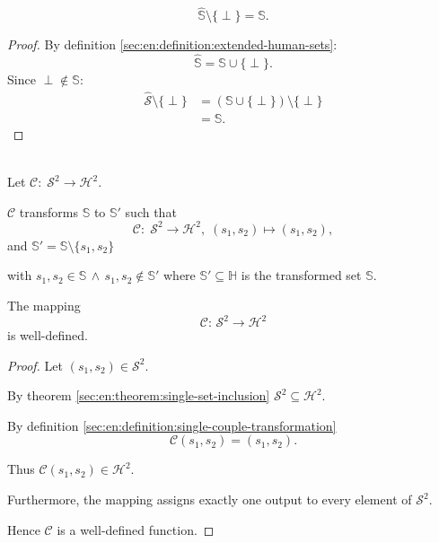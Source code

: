 \begin{proposition}
    \begin{statement}
        $$\hat{\mathbb{S}}\setminus\{\perp\}=\mathbb{S}.$$
    \end{statement}
    \begin{proof}
        By definition \ref{sec:en:definition:extended-human-sets}:
        $$\hat{\mathbb{S}}=\mathbb{S}\cup\{\perp\}.$$
        Since $\perp\notin\mathbb{S}$:
        \begin{align*}
            \hat{\mathcal{S}}\setminus\{\perp\} &= (\mathbb{S}\cup\{\perp\})\setminus\{\perp\} \\
            &= \mathbb{S}.
        \end{align*}
    \end{proof}
\end{proposition}

\begin{definition}\label{sec:en:definition:single-couple-transformation}
    \leavevmode\\
    Let $\mathcal{C}:\;\mathcal{S}^2\rightarrow\mathcal{H}^2$.

    $\mathcal{C}$ transforms $\mathbb{S}$ to $\mathbb{S}'$ such that 
    $$\mathcal{C}:\;\mathcal{S}^2\rightarrow\mathcal{H}^2,\;(s_1,s_2)\mapsto(s_1,s_2),$$ 
    and $\mathbb{S}'=\mathbb{S}\setminus\{s_1,s_2\}$

    with $s_1,s_2\in\mathbb{S}\,\land\,s_1,s_2\notin\mathbb{S}'$ where $\mathbb{S}'\subseteq\mathbb{H}$ is the transformed set $\mathbb{S}$.
\end{definition}

\begin{proposition}\label{sec:en:prop:well-def-sct}
    \begin{statement}
        The mapping
        $$\mathcal{C}:\,\mathcal{S}^2\rightarrow\mathcal{H}^2$$
        is well-defined.
    \end{statement}
    \begin{proof}
        Let $(s_1,s_2)\in\mathcal{S}^2$.
        
        By theorem \ref{sec:en:theorem:single-set-inclusion} $\mathcal{S}^2\subseteq\mathcal{H}^2$.

        By definition \ref{sec:en:definition:single-couple-transformation}
        $$\mathcal{C}(s_1,s_2)=(s_1,s_2).$$
        
        Thus $\mathcal{C}(s_1,s_2)\in\mathcal{H}^2.$
        
        Furthermore, the mapping assigns exactly one output to every element of \(\mathcal S^2\).
        
        Hence \(\mathcal C\) is a well-defined function.
    \end{proof}
\end{proposition}

